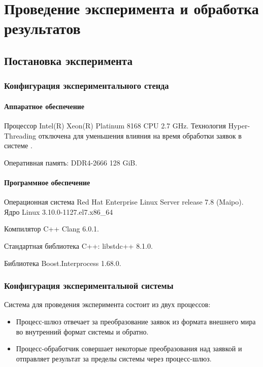 \chapter{Проведение эксперимента и обработка результатов}

\section{Постановка эксперимента}

\subsection{Конфигурация экспериментального стенда}

\subsubsection{Аппаратное обеспечение}

Процессор Intel(R) Xeon(R) Platinum 8168 CPU 2.7 GHz.
Технология Hyper-Threading отключена для уменьшения влияния на время обработки заявок в системе \cite{LowLatencyHT}.

Оперативная память: DDR4-2666 128 GiB.

\subsubsection{Программное обеспечение}

Операционная система Red Hat Enterprise Linux Server release 7.8 (Maipo).
Ядро Linux 3.10.0-1127.el7.x86\_64

Компилятор C++ Clang 6.0.1.

Стандартная библиотека C++: libstdc++ 8.1.0.

Библиотека Boost.Interprocess 1.68.0.

\subsection{Конфигурация экспериментальной системы}

Система для проведения эксперимента состоит из двух процессов:
\begin{itemize}
\item Процесс-шлюз отвечает за преобразование заявок из формата внешнего мира во внутренний формат системы и обратно. 
\item Процесс-обработчик совершает некоторые преобразования над заявкой и отправляет результат за пределы системы через процесс-шлюз.
\end{itemize}

